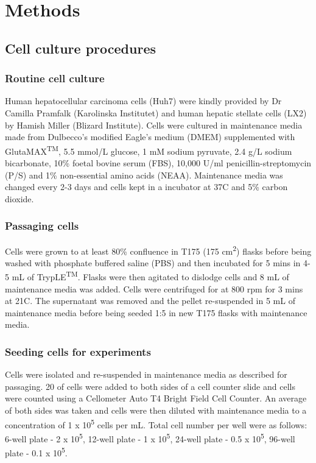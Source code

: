 \chapter{\label{ch:2-Methods}Methods}

\minitoc

\section{Cell culture procedures}

\subsection{Routine cell culture}

Human hepatocellular carcinoma cells (Huh7) were kindly provided by Dr Camilla Pramfalk (Karolinska Institutet) and human hepatic stellate cells (LX2) by Hamish Miller (Blizard Institute). Cells were cultured in maintenance media made from Dulbecco's modified Eagle's medium (DMEM) supplemented with GlutaMAX\textsuperscript{TM}, 5.5 mmol/L glucose, 1 mM sodium pyruvate, 2.4 g/L sodium bicarbonate, 10\% foetal bovine serum (FBS), 10,000 U/ml penicillin-streptomycin (P/S) and 1\% non-essential amino acids (NEAA). Maintenance media was changed every 2-3 days and cells kept in a incubator at 37\textdegree C and 5\% carbon dioxide. 

\subsection{Passaging cells}

Cells were grown to at least 80\% confluence in T175 (175 cm\textsuperscript{2}) flasks before being washed with phosphate buffered saline (PBS) and then incubated for 5 mins in 4-5 mL of TrypLE\textsuperscript{TM}. Flasks were then agitated to dislodge cells and 8 mL of maintenance media was added. Cells were centrifuged for at 800 rpm for 3 mins at 21\textdegree C. The supernatant was removed and the pellet re-suspended in 5 mL of maintenance media before being seeded 1:5 in new T175 flasks with maintenance media.

\subsection{Seeding cells for experiments}

Cells were isolated and re-suspended in maintenance media as described for passaging. 20 \uL of cells were added to both sides of a cell counter slide and cells were counted using a Cellometer Auto T4 Bright Field Cell Counter. An average of both sides was taken and cells were then diluted with maintenance media to a concentration of 1 x 10\textsuperscript{5} cells per mL. Total cell number per well were as follows: 6-well plate - 2 x 10\textsuperscript{5}, 12-well plate - 1 x 10\textsuperscript{5}, 24-well plate - 0.5 x 10\textsuperscript{5}, 96-well plate - 0.1 x 10\textsuperscript{5}.

